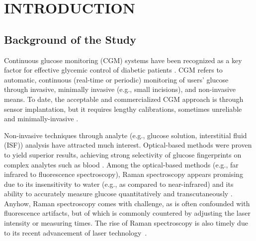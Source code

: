 \chapter{INTRODUCTION} 

\section{Background of the Study}


Continuous glucose monitoring (CGM) systems have been recognized as a key factor for effective glycemic control of diabetic patients \citep{continuous2021}.
CGM refers to automatic, continuous (real-time or periodic) monitoring of users' glucose through invasive, minimally invasive (e.g., small incisions), and non-invasive means.
To date, the acceptable and commercialized CGM approach is through sensor implantation, but it requires lengthy calibrations, sometimes unreliable and minimally-invasive \citep{CGMminimalinvasive}.

Non-invasive techniques through analyte (e.g., glucose solution, interstitial fluid (ISF)) analysis have attracted much interest.
Optical-based methods were proven to yield superior results, achieving strong selectivity of glucose fingerprints on complex analytes such as blood \citep{opticalBest}.
Among the optical-based methods (e.g., far infrared to fluorescence spectroscopy), Raman spectroscopy appears promising due to its insensitivity to water (e.g., as compared to near-infrared) and its ability to accurately measure glucose quantitatively and transcutaneously \citep{directGlucose}.
Anyhow, Raman spectroscopy comes with challenge, as is often confounded with fluorescence artifacts, but of which is commonly countered by adjusting the laser intensity or measuring times.  
The rise of Raman spectroscopy is also timely due to its recent advancement of laser technology~\citep{horibahistory}.

